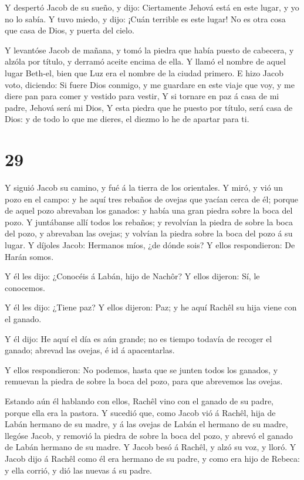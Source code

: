  Y despertó Jacob de su sueño, y dijo: Ciertamente Jehová
está en este lugar, y yo no lo sabía.  Y tuvo miedo, y
dijo: ¡Cuán terrible es este lugar! No es otra cosa que casa de Dios, y
puerta del cielo.

 Y levantóse Jacob de mañana, y tomó la piedra que había
puesto de cabecera, y alzóla por título, y derramó aceite encima de
ella.  Y llamó el nombre de aquel lugar Beth-el, bien que
Luz era el nombre de la ciudad primero.  E hizo Jacob voto,
diciendo: Si fuere Dios conmigo, y me guardare en este viaje que voy, y
me diere pan para comer y vestido para vestir,  Y si
tornare en paz á casa de mi padre, Jehová será mi Dios,  Y
esta piedra que he puesto por título, será casa de Dios: y de todo lo
que me dieres, el diezmo lo he de apartar para ti.

\hypertarget{section-28}{%
\section{29}\label{section-28}}

 Y siguió Jacob su camino, y fué á la tierra de los
orientales.  Y miró, y vió un pozo en el campo: y he aquí
tres rebaños de ovejas que yacían cerca de él; porque de aquel pozo
abrevaban los ganados: y había una gran piedra sobre la boca del pozo.
 Y juntábanse allí todos los rebaños; y revolvían la piedra
de sobre la boca del pozo, y abrevaban las ovejas; y volvían la piedra
sobre la boca del pozo á su lugar.  Y díjoles Jacob:
Hermanos míos, ¿de dónde sois? Y ellos respondieron: De Harán somos.

 Y él les dijo: ¿Conocéis á Labán, hijo de Nachôr? Y ellos
dijeron: Sí, le conocemos.

 Y él les dijo: ¿Tiene paz? Y ellos dijeron: Paz; y he aquí
Rachêl su hija viene con el ganado.

 Y él dijo: He aquí el día es aún grande; no es tiempo
todavía de recoger el ganado; abrevad las ovejas, é id á apacentarlas.

 Y ellos respondieron: No podemos, hasta que se junten todos
los ganados, y remuevan la piedra de sobre la boca del pozo, para que
abrevemos las ovejas.

 Estando aún él hablando con ellos, Rachêl vino con el
ganado de su padre, porque ella era la pastora.  Y sucedió
que, como Jacob vió á Rachêl, hija de Labán hermano de su madre, y á las
ovejas de Labán el hermano de su madre, llegóse Jacob, y removió la
piedra de sobre la boca del pozo, y abrevó el ganado de Labán hermano de
su madre.  Y Jacob besó á Rachêl, y alzó su voz, y lloró.
 Y Jacob dijo á Rachêl como él era hermano de su padre, y
como era hijo de Rebeca: y ella corrió, y dió las nuevas á su padre.

